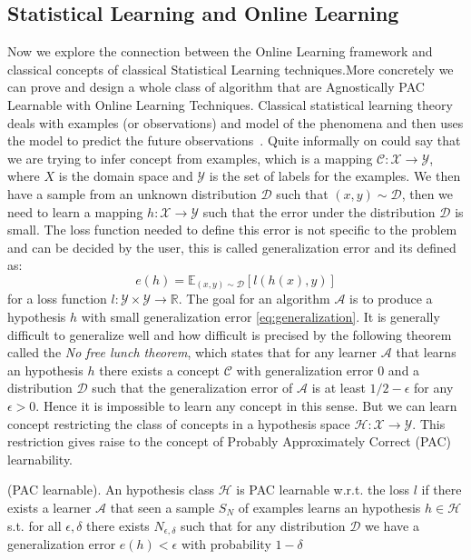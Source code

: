 \subsection{Statistical Learning and Online Learning}
Now we explore the connection between the Online Learning framework and classical concepts of classical Statistical Learning techniques.More concretely we can prove and design a whole class of algorithm that are Agnostically PAC Learnable with Online Learning Techniques.
Classical statistical learning theory deals with examples (or observations) and model of the phenomena and then uses the model to predict the future observations~\cite{bousquet2003introduction}. Quite informally on could say that we are trying to infer concept from examples, which is a mapping $\mathcal C:\mathcal X\to\mathcal Y$, where $X$ is the domain space and $\mathcal Y$ is the set of labels for the examples. We then have a sample from an unknown distribution $\mathcal D$ such that $(x,y)\sim \mathcal D$, then we need to learn a mapping $h:\mathcal X\to\mathcal Y$ such that the error under the distribution $\mathcal D$ is small. The loss function needed to define this error is not specific to the problem and can be decided by the user, this is called generalization error and its defined as:
\begin{equation}\label{eq:generalization}
    e(h) = \mathbb E_{(x,y)\sim \mathcal D}[l(h(x),y)]
\end{equation}
 for a loss function $l:\mathcal Y\times\mathcal Y \to\mathbb R$. The goal for an algorithm $\mathcal A$ is to produce a hypothesis $h$ with small generalization error \eqref{eq:generalization}.
It is generally difficult to generalize well and how difficult is precised by the following theorem called the \emph{No free lunch theorem}, which states that for any learner $\mathcal A$ that learns an hypothesis $h$ there exists a concept $\mathcal C$ with generalization error $0$ and a distribution $\mathcal D$ such that the generalization error of $\mathcal A$ is at least $1/2-\epsilon$ for any $\epsilon>0$. Hence it is impossible to learn any concept in this sense. But we can learn concept restricting the class of concepts in a hypothesis space $\mathcal H:\mathcal X\to\mathcal Y$.
This restriction gives raise to the concept of Probably Approximately Correct (PAC) learnability. 

\begin{definition}(PAC learnable).\label{def:PAC}
    An hypothesis class $\mathcal H$ is PAC learnable w.r.t. the loss $l$ if there exists a learner $\mathcal A$ that seen a sample $S_N$ of examples learns an hypothesis $h\in\mathcal H$ s.t. for all $\epsilon,\delta$ there exists $N_{\epsilon,\delta}$ such that for any distribution $\mathcal D$ we have a generalization error $e(h)<\epsilon$ with probability $1-\delta$
\end{definition}

